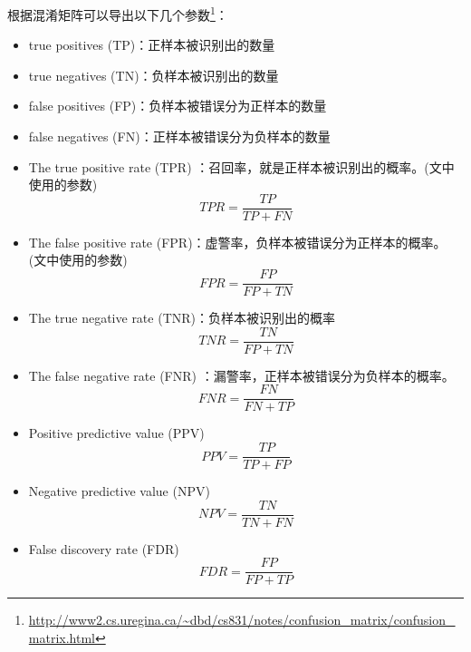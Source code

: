 \documentclass[12pt]{article}
\begin{document}
根据混淆矩阵可以导出以下几个参数\footnote{\url{http://www2.cs.uregina.ca/~dbd/cs831/notes/confusion_matrix/confusion_matrix.html}}：
\begin{itemize}
    \item true positives (TP)：正样本被识别出的数量
    \item true negatives (TN)：负样本被识别出的数量
    \item false positives (FP)：负样本被错误分为正样本的数量
    \item false negatives (FN)：正样本被错误分为负样本的数量\newline
    
    \item {\color{blue}The true positive rate (TPR) ：召回率，就是正样本被识别出的概率。}(文中使用的参数)
        \begin{displaymath}
            TPR=\frac{TP}{TP+FN}
        \end{displaymath}
     \item {\color{blue}The false positive rate (FPR)：虚警率，负样本被错误分为正样本的概率。}(文中使用的参数)
        \begin{displaymath}
            FPR=\frac{FP}{FP+TN}
        \end{displaymath}
    \item The true negative rate (TNR)：负样本被识别出的概率
        \begin{displaymath}
            TNR=\frac{TN}{FP+TN}
        \end{displaymath}

    \item The false negative rate (FNR) ：漏警率，正样本被错误分为负样本的概率。
        \begin{displaymath}
            FNR=\frac{FN}{FN+TP}
        \end{displaymath}
    \item Positive predictive value (PPV)
        \begin{displaymath}
            PPV=\frac{TP}{TP+FP}
        \end{displaymath}
    \item Negative predictive value (NPV)
        \begin{displaymath}
            NPV=\frac{TN}{TN+FN}
        \end{displaymath}
    \item False discovery rate (FDR)
        \begin{displaymath}
            FDR=\frac{FP}{FP+TP}
        \end{displaymath}
\end{itemize}





%


\end{document}
